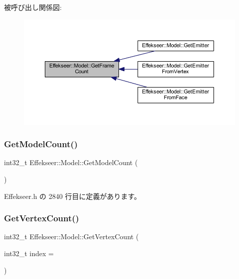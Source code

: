 被呼び出し関係図\+:\nopagebreak
\begin{figure}[H]
\begin{center}
\leavevmode
\includegraphics[width=350pt]{class_effekseer_1_1_model_a7d4897bc5dffe71d6814a99b32b57c16_icgraph}
\end{center}
\end{figure}
\mbox{\label{class_effekseer_1_1_model_ad91886d20e51178e39575730791d011f}} 
\subsubsection{\texorpdfstring{Get\+Model\+Count()}{GetModelCount()}}
{\footnotesize\ttfamily int32\+\_\+t Effekseer\+::\+Model\+::\+Get\+Model\+Count (\begin{DoxyParamCaption}{ }\end{DoxyParamCaption})\hspace{0.3cm}{\ttfamily [inline]}}



 Effekseer.\+h の 2840 行目に定義があります。

\mbox{\label{class_effekseer_1_1_model_a63308d170d52e2b12fd1a479f5e6ccf1}} 
\subsubsection{\texorpdfstring{Get\+Vertex\+Count()}{GetVertexCount()}}
{\footnotesize\ttfamily int32\+\_\+t Effekseer\+::\+Model\+::\+Get\+Vertex\+Count (\begin{DoxyParamCaption}\item[{int32\+\_\+t}]{index = {} }\end{DoxyParamCaption})\hspace{0.3cm}{\ttfamily [inline]}}



